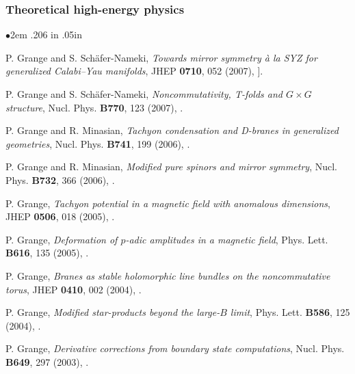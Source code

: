 \documentclass[a4paper, 12pt]{scrartcl}
\newcommand{\pubSpace}{\vspace{-0.27in}}
\begin{document}
\subsubsection*{\sc \bf Theoretical high-energy physics}
\begin{list}{$\bullet$}{ 2em \leftmargin .206 in \itemsep .05in }
\item \vspace{-.03in} P. Grange and S. Sch\"afer-Nameki, {\em Towards mirror symmetry \`a la SYZ for generalized  Calabi--Yau
manifolds}, JHEP {\bf 0710}, 052 (2007), {\ttfamily [arXiv:0708.2392 [hep-th]]}.\\ \pubSpace  
\item \vspace{-.03in} P. Grange and S. Sch\"afer-Nameki, {\em Noncommutativity, T-folds and $G\times G$ structure},
 Nucl. Phys. {\bf B770}, 123 (2007), {}.\\ \pubSpace  
\item \vspace{-.03in} P. Grange and R. Minasian, {\em Tachyon condensation and D-branes in generalized geometries},
 Nucl. Phys. {\bf B741}, 199 (2006), {}.\\ \pubSpace  
\item \vspace{-.02in} P. Grange and R. Minasian, {\em Modified pure spinors and mirror symmetry},
 Nucl. Phys. {\bf B732}, 366 (2006), {}.\\ \pubSpace  
\item \vspace{-.03in} P. Grange, {\em Tachyon potential in a magnetic field with anomalous dimensions},
JHEP {\bf 0506}, 018 (2005), {}.\\ \pubSpace  
\item \vspace{-.03in} P. Grange, {\em Deformation of $p$-adic amplitudes in a magnetic field},
Phys. Lett. {\bf B616}, 135 (2005), {}.\\ \pubSpace  
\item \vspace{-.03in} P. Grange, {\em Branes as stable holomorphic line bundles on the noncommutative torus},
JHEP {\bf 0410}, 002 (2004), {}.\\ \pubSpace  
\item \vspace{-.03in} P. Grange, {\em Modified star-products beyond the large-$B$ limit}, 
Phys. Lett. {\bf B586}, 125 (2004), {}.\\ \pubSpace  
\item \vspace{-.03in} P. Grange, {\em Derivative corrections from boundary state computations}, Nucl. Phys.
{\bf B649}, 297 (2003), {}. \\
\end{list}
\vspace{-0.37in}
\end{document}
